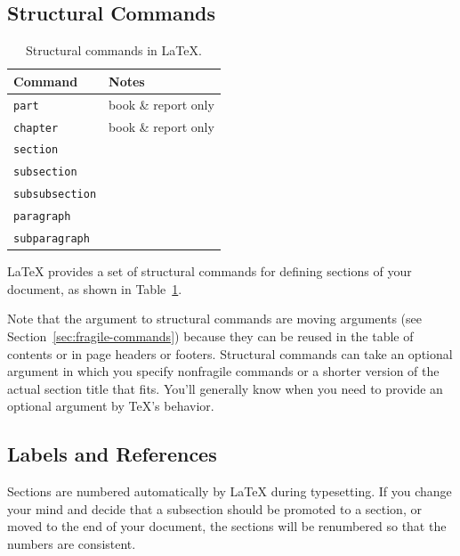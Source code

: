 \documentclass{icmmcm}
\newcommand{\bslash}{\symbol{'134}}%
\newcommand{\bsl}{{\texttt{\bslash}}}
\newcommand{\com}[1]{\bsl\texttt{#1}\xspace}
\newcommand{\class}[1]{\textsf{#1}\xspace}
\newcommand{\latex}{\LaTeX\xspace}
\begin{document}
\subsection{Structural Commands}%
\label{sec:structural-commands}

\begin{table}
\centering
\begin{tabular}{ll}
\toprule
Command           & Notes                               \\
\midrule
\com{part}        & \class{book} \& \class{report} only \\
\com{chapter}     &\class{book} \& \class{report} only  \\
\com{section}                                           \\
\com{subsection}                                        \\
\com{subsubsection}                                     \\
\com{paragraph}                                         \\
\com{subparagraph}                                      \\
\bottomrule
\end{tabular}
\caption[Structural commands in \latex]{Structural commands in \latex.}%
\label{tab:structural-commands}
\end{table}

\latex provides a set of structural commands for defining sections of
your document, as shown in Table~\ref{tab:structural-commands}.

Note that the argument to structural commands are moving arguments
(see Section~\ref{sec:fragile-commands}) because they can be reused in
the table of contents or in page headers or footers.  Structural
commands can take an optional argument in which you specify nonfragile
commands or a shorter version of the actual section title that fits.
You'll generally know when you need to provide an optional argument by
\TeX's behavior.


\subsection{Labels and References}%
\label{sec:labels-and-references}

Sections are numbered automatically by \latex during typesetting.  If
you change your mind and decide that a subsection should be promoted
to a section, or moved to the end of your document, the sections will
be renumbered so that the numbers are consistent. 
\end{document}
